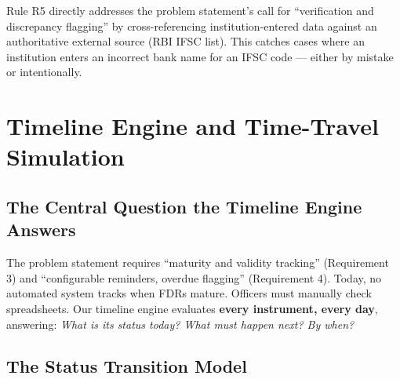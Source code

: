 \documentclass[12pt, a4paper]{report}
\begin{document}
\begin{connectionbox}
Rule R5 directly addresses the problem statement's call for ``verification and discrepancy flagging'' by cross-referencing institution-entered data against an authoritative external source (RBI IFSC list). This catches cases where an institution enters an incorrect bank name for an IFSC code --- either by mistake or intentionally.
\end{connectionbox}


\chapter{Timeline Engine and Time-Travel Simulation}

\section{The Central Question the Timeline Engine Answers}

\begin{connectionbox}
The problem statement requires ``maturity and validity tracking'' (Requirement 3) and ``configurable reminders, overdue flagging'' (Requirement 4). Today, no automated system tracks when FDRs mature. Officers must manually check spreadsheets. Our timeline engine evaluates \textbf{every instrument, every day}, answering: \textit{What is its status today? What must happen next? By when?}
\end{connectionbox}

\section{The Status Transition Model}
\end{document}
